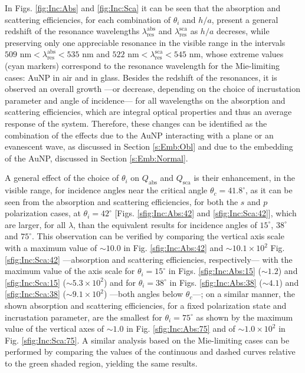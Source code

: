 In Figs. \ref{fig:Inc:Abs} and \ref{fig:Inc:Sca} it can be seen that the absorption and scattering efficiencies, for each combination of $\theta_i$ and $h/a$, present a general redshift of the resonance wavelengths $\lambda_\text{res}^\text{abs}$ and $\lambda_\text{res}^\text{sca}$ as $h/a$ decreses, while preserving only one appreciable resonance in the visible range in the intervals $509\text{ nm} < \lambda_\text{res}^\text{abs} < 535 \text{ nm}$ and  $522\text{ nm} < \lambda_\text{res}^\text{sca} < 545 \text{ nm}$, whose extreme values (cyan markers) correspond to the resonance wavelength for the Mie-limiting cases: AuNP in air and in glass. Besides the redshift of the resonances, it is observed an overall growth ---or decrease, depending on the choice of incrustation parameter and angle of incidence--- for all wavelengths on the absorption and scattering efficiencies, which are integral optical properties and thus an average response of the system. Therefore, these changes can be identified as the combination of the effects due to  the AuNP interacting with a plane or an evanescent wave, as discussed in Section \ref{s:Emb:Obl} and due to the embedding of the AuNP, discussed in Section \ref{s:Emb:Normal}.

A general effect of the choice of $\theta_i$ on $Q_\text{abs}$ and $Q_\text{sca}$ is their enhancement, in the visible range, for incidence angles near the critical angle $\theta_c = 41.8^\circ$, as it can be seen from the absorption and scattering efficiencies, for both the $s$ and $p$ polarization cases, at $\theta_i = 42^\circ$ [Figs. \ref{sfig:Inc:Abs:42} and \ref{sfig:Inc:Sca:42}], which are larger, for all $\lambda$, than the equivalent results for incidence angles of $15^\circ$, $38^\circ$ and $75^\circ$. This observation can be verified by comparing the vertical axis scale with a maximum value of $\sim 10.0$ in Fig. \ref{sfig:Inc:Abs:42} and  $\sim 10.1 \times 10^{2} $ Fig. \ref{sfig:Inc:Sca:42} ---absorption and scattering efficiencies, respectively--- with the maximum value of the axis scale for $\theta_i = 15^\circ$ in Figs. \ref{sfig:Inc:Abs:15} ($\sim 1.2$) and \ref{sfig:Inc:Sca:15} ($\sim 5.3 \times 10^{2}$) and for $\theta_i = 38^\circ$ in  Figs. \ref{sfig:Inc:Abs:38} ($\sim 4.1$) and \ref{sfig:Inc:Sca:38} ($\sim 9.1  \times 10^{2}$) ---both angles below $\theta_c$---; on a similar manner, the shown absorption and scattering efficiencies, for a fixed polarization state and incrustation parameter, are the smallest for $\theta_i = 75^\circ$ as shown by the maximum value of the vertical axes of $\sim 1.0$ in Fig. \ref{sfig:Inc:Abs:75} and of $\sim 1.0\times 10^2$ in Fig. \ref{sfig:Inc:Sca:75}. A similar analysis based on the Mie-limiting cases can be performed by comparing the values of the continuous and dashed curves relative to the green shaded region, yielding the same results.

